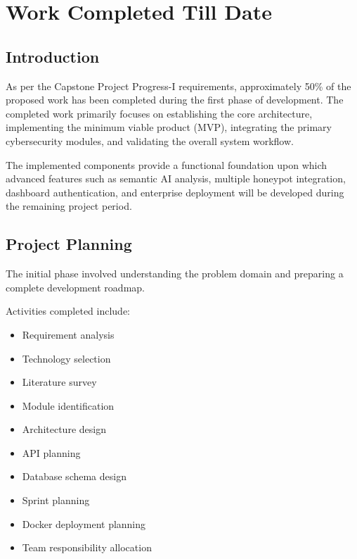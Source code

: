 \documentclass[12pt,a4paper]{report}
\begin{document}
\clearpage


\chapter{Work Completed Till Date}

\section{Introduction}

As per the Capstone Project Progress-I requirements, approximately 50\% of the proposed work has been completed during the first phase of development. The completed work primarily focuses on establishing the core architecture, implementing the minimum viable product (MVP), integrating the primary cybersecurity modules, and validating the overall system workflow.

The implemented components provide a functional foundation upon which advanced features such as semantic AI analysis, multiple honeypot integration, dashboard authentication, and enterprise deployment will be developed during the remaining project period.


\section{Project Planning}

The initial phase involved understanding the problem domain and preparing a complete development roadmap.

Activities completed include:

\begin{itemize}
\item Requirement analysis
\item Technology selection
\item Literature survey
\item Module identification
\item Architecture design
\item API planning
\item Database schema design
\item Sprint planning
\item Docker deployment planning
\item Team responsibility allocation
\end{itemize}
\end{document}

